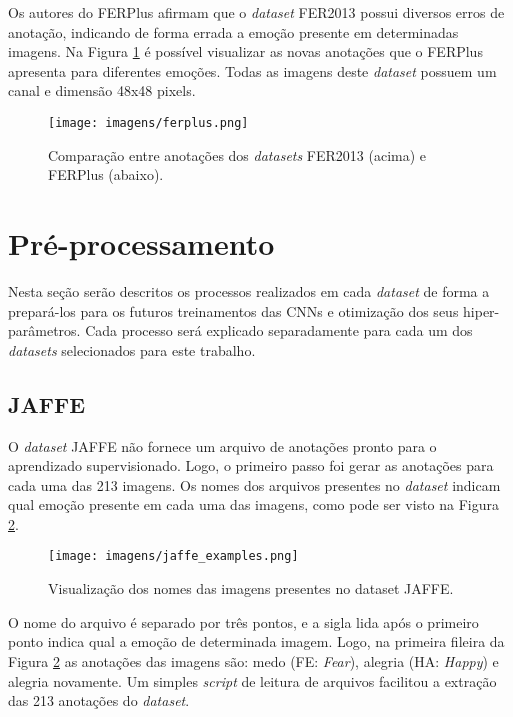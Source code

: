 \documentclass[
12pt,       %
openright,      %
oneside,      %
a4paper,      %
english,      %
french,       %
spanish,      %
brazil        %
]{abntex2}
\begin{document}
Os autores do FERPlus afirmam que o \textit{dataset} FER2013 possui diversos erros de anotação, indicando de forma errada a emoção presente em determinadas imagens. Na Figura \ref{fig:ferplus} é possível visualizar as novas anotações que o FERPlus apresenta para diferentes emoções. Todas as imagens deste \textit{dataset} possuem um canal e dimensão 48x48 pixels.

\begin{figure}[ht]
\centering
\caption{Comparação entre anotações dos \textit{datasets} FER2013 (acima) e FERPlus (abaixo).}
\texttt{[image: imagens/ferplus.png]}
\label{fig:ferplus}
\end{figure}

\section{Pré-processamento} \label{preprocessamento}

Nesta seção serão descritos os processos realizados em cada \textit{dataset} de forma a prepará-los para os futuros treinamentos das CNNs e otimização dos seus hiper-parâmetros. Cada processo será explicado separadamente para cada um dos \textit{datasets} selecionados para este trabalho.

\subsection{JAFFE} \label{preprocessamento-jaffe}

O \textit{dataset} JAFFE não fornece um arquivo de anotações pronto para o aprendizado supervisionado. Logo, o primeiro passo foi gerar as anotações para cada uma das 213 imagens. Os nomes dos arquivos  presentes no \textit{dataset} indicam qual emoção presente em cada uma das imagens, como pode ser visto na Figura \ref{fig:jaffe_examples}.

\begin{figure}[ht]
\centering
\caption{Visualização dos nomes das imagens presentes no dataset JAFFE.}
\texttt{[image: imagens/jaffe\_examples.png]}
\label{fig:jaffe_examples}
\end{figure}

O nome do arquivo é separado por três pontos, e a sigla lida após o primeiro ponto indica qual a emoção de determinada imagem. Logo, na primeira fileira da Figura \ref{fig:jaffe_examples} as anotações das imagens são: medo (FE: \textit{Fear}), alegria (HA: \textit{Happy}) e alegria novamente. Um simples \textit{script} de leitura de arquivos facilitou a extração das 213 anotações do \textit{dataset}.
\end{document}
